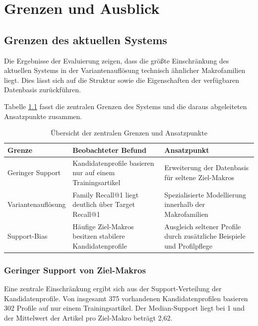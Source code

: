 \chapter{Grenzen und Ausblick}
\label{chap:grenzen_und_ausblick}

\section{Grenzen des aktuellen Systems}

Die Ergebnisse der Evaluierung zeigen, dass die größte Einschränkung des aktuellen Systems in der Variantenauflösung technisch ähnlicher Makrofamilien liegt.
Dies lässt sich auf die Struktur sowie die Eigenschaften der verfügbaren Datenbasis zurückführen.\parencite{LTR_Configuration_Test_Series}

Tabelle \ref{tab:grenzen_uebersicht} fasst die zentralen Grenzen des Systems und die daraus abgeleiteten Ansatzpunkte zusammen.

\begin{table}[H]
	\centering
	\setlength{\tabcolsep}{4pt}
	\renewcommand{\arraystretch}{1.1}
	\caption{Übersicht der zentralen Grenzen und Ansatzpunkte}
	\label{tab:grenzen_uebersicht}
	\begin{tabularx}{\textwidth}{>{\raggedright\arraybackslash}p{3.5cm} >{\raggedright\arraybackslash}p{4.0cm} >{\raggedright\arraybackslash}X}
		\toprule
		\textbf{Grenze} & \textbf{Beobachteter Befund} & \textbf{Ansatzpunkt} \\
		\midrule
		Geringer Support & 302 Kandidatenprofile basieren nur auf einem Trainingsartikel & Erweiterung der Datenbasis für seltene Ziel-Makros \\
		Variantenauflösung & Family Recall@1 liegt deutlich über Target Recall@1 & Spezialisierte Modellierung innerhalb der Makrofamilien \\
		Support-Bias & Häufige Ziel-Makros besitzen stabilere Kandidatenprofile & Ausgleich seltener Profile durch zusätzliche Beispiele und Profilpflege \\
		\bottomrule
	\end{tabularx}
\end{table}

\subsection{Geringer Support von Ziel-Makros}

Eine zentrale Einschränkung ergibt sich aus der Support-Verteilung der Kandidatenprofile. Von insgesamt 375 vorhandenen Kandidatenprofilen basieren 302 Profile auf nur einem Trainingsartikel.
Der Median-Support liegt bei 1 und der Mittelwert der Artikel pro Ziel-Makro \parencite{EPLAN-Makros} beträgt 2,62.

